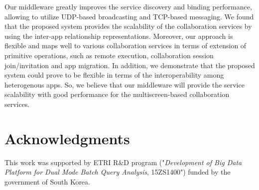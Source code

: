 \documentclass[conference]{IEEEtran}
\begin{document}
Our middleware greatly improves the service discovery and binding performance, allowing to utilize UDP-based broadcasting and TCP-based messaging.
    We found that the proposed system provides the scalability of the collaboration services by using the inter-app relationship representations.
    Moreover, our approach is flexible and maps well to various collaboration services in terms of extension of primitive operations, such as remote execution, collaboration session join/invitation and app migration.
In addition, we demonstrate that the proposed system could prove to be flexible in terms of the interoperability among heterogenous apps. 
So, we believe that our middleware will provide the service scalability with good performance for the multiscreen-based collaboration services.

\section*{Acknowledgments}
This work was supported by ETRI R\&D program ("\textit{Development of Big Data Platform for Dual Mode Batch Query Analysis}, 15ZS1400")
funded by the government of South Korea.

%

\end{document}
